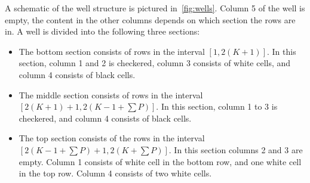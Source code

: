 A schematic of the well structure is pictured in~\autoref{fig:wells}. Column 5 of the well is empty, the content in the other columns depends on which section the rows are in. A well is divided into the following three sections:

\begin{itemize}
\item The bottom section consists of rows in the interval $\left[ 1, 2 \left( K+1 \right) \right]$. In this section, column 1 and 2 is checkered, column 3 consists of white cells, and column 4 consists of black cells.

\item The middle section consists of rows in the interval $\left[ 2 \left( K+1 \right) +1, 2 \left( K-1 + \sum P \right) \right]$. In this section, column 1 to 3 is checkered, and column 4 consists of black cells.

\item The top section consists of the rows in the interval $\left[2 \left( K-1 + \sum P \right) +1, 2 \left( K + \sum P \right) \right]$. In this section columns 2 and 3 are empty. Column 1 consists of white cell in the bottom row, and one white cell in the top row. Column 4 consists of two white cells.

\end{itemize}

